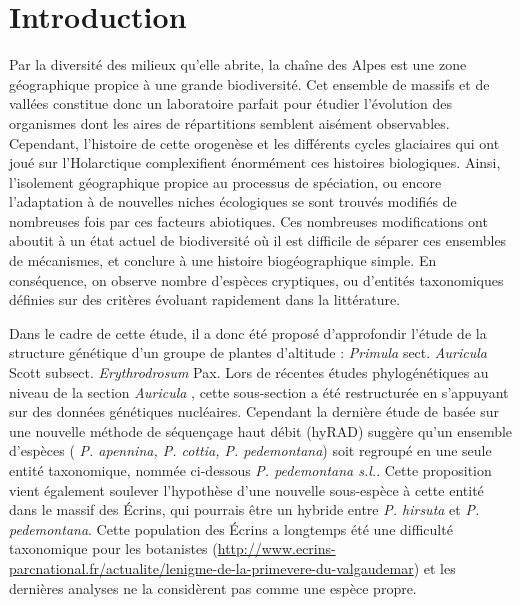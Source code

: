 \section{Introduction}

Par la diversité des milieux qu'elle abrite, la chaîne des Alpes est une zone géographique propice à une grande biodiversité.
 Cet ensemble de massifs et de vallées constitue donc un laboratoire parfait pour étudier l'évolution des organismes dont les aires de répartitions semblent aisément observables.
 Cependant, l'histoire de cette orogenèse et les différents cycles glaciaires qui ont joué sur l'Holarctique complexifient énormément ces histoires biologiques.
 Ainsi, l'isolement géographique propice au processus de spéciation, ou encore l'adaptation à de nouvelles niches écologiques se sont trouvés modifiés de nombreuses fois par ces facteurs abiotiques.
 Ces nombreuses modifications ont aboutit à un état actuel de biodiversité où il est difficile de séparer ces ensembles de mécanismes, et conclure à une histoire biogéographique simple.
 En conséquence, on observe nombre d'espèces cryptiques, ou d'entités taxonomiques définies sur des critères évoluant rapidement dans la littérature.

Dans le cadre de cette étude, il a donc été proposé d'approfondir l'étude de la structure génétique d'un groupe de plantes d'altitude : \textit{Primula} sect. \textit{Auricula} Scott subsect. \textit{Erythrodrosum} Pax. 
 Lors de récentes études phylogénétiques au niveau de la section \textit{Auricula} \citep{Zhang2004,Zhang2004a, Boucher2016a}, cette sous-section a été restructurée en s'appuyant sur des données génétiques nucléaires.
 Cependant la dernière étude de \citet{Boucher2016a} basée sur une nouvelle méthode de séquençage haut débit (hyRAD) suggère qu'un ensemble d'espèces ( \textit{P. apennina, P. cottia, P. pedemontana}) soit regroupé en une seule entité taxonomique, nommée ci-dessous \textit{P. pedemontana s.l.}.
 Cette proposition vient également soulever l'hypothèse d'une nouvelle sous-espèce à cette entité dans le massif des Écrins, qui pourrais être un hybride entre \textit{P. hirsuta} et \textit{P. pedemontana}.
 Cette population des Écrins a longtemps été une difficulté taxonomique pour les botanistes (\url{http://www.ecrins-parcnational.fr/actualite/lenigme-de-la-primevere-du-valgaudemar}) et les dernières analyses ne la considèrent pas comme une espèce propre.
 
